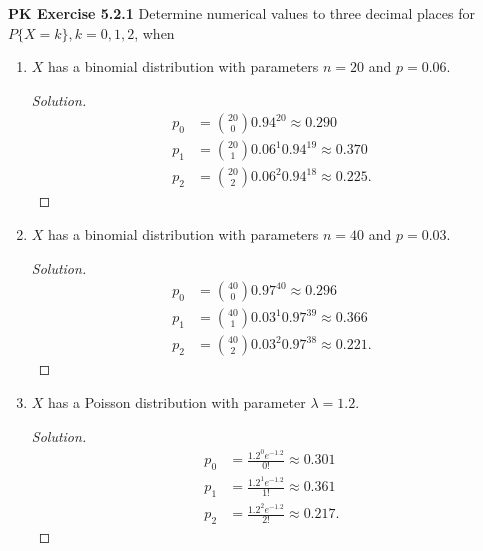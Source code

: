 \documentclass{article}
\begin{document}
\textbf{PK Exercise 5.2.1}
Determine numerical values to three decimal places for $P\{X = k\}, k = 0, 1, 2$, when
\begin{enumerate}[label=(\alph*)]
    \item $X$ has a binomial distribution with parameters $n = 20$ and $p = 0.06$.
    \begin{proof}[Solution]
        \begin{align*}
            p_0 & = {20\choose 0}0.94^{20} \approx 0.290 \\
            p_1 & = {20\choose 1}0.06^{1}0.94^{19} \approx 0.370 \\
            p_2 & = {20\choose 2}0.06^{2}0.94^{18} \approx 0.225.
        \end{align*}
    \end{proof}
    \item $X$ has a binomial distribution with parameters $n = 40$ and $p = 0.03$.
    \begin{proof}[Solution]
        \begin{align*}
            p_0 & = {40\choose 0}0.97^{40} \approx 0.296 \\
            p_1 & = {40\choose 1}0.03^{1}0.97^{39} \approx 0.366 \\
            p_2 & = {40\choose 2}0.03^{2}0.97^{38} \approx 0.221.
        \end{align*}
    \end{proof}
    \item $X$ has a Poisson distribution with parameter $\lambda = 1.2$.
    \begin{proof}[Solution]
        \begin{align*}
            p_0 & = \frac{1.2^0e^{-1.2}}{0!} \approx 0.301 \\
            p_1 & = \frac{1.2^1e^{-1.2}}{1!} \approx 0.361 \\
            p_2 & = \frac{1.2^2e^{-1.2}}{2!} \approx 0.217.
        \end{align*}
    \end{proof}
\end{enumerate}
\bigbreak
\end{document}
